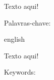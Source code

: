 
\begin{resumo}
    \vspace{-15pt}
    
    Texto aqui!


    Palavras-chave: \palavraschaveemlinha
\end{resumo}



\begin{resumo}[Abstract]
    \vspace{-15pt}
    
    \begin{otherlanguage*}{english}
    
        Texto aqui!
        
        Keywords: \inlinekeywords
    \end{otherlanguage*}
\end{resumo}